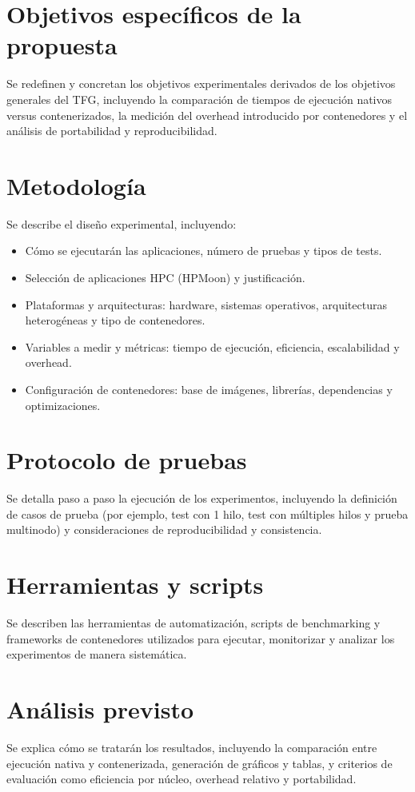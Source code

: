 \section{Objetivos específicos de la propuesta}\label{sec:objetivos_especificos}
Se redefinen y concretan los objetivos experimentales derivados de los objetivos generales del TFG, incluyendo la comparación de tiempos de ejecución nativos versus contenerizados, la medición del overhead introducido por contenedores y el análisis de portabilidad y reproducibilidad.

\section{Metodología}\label{sec:metodologia}
Se describe el diseño experimental, incluyendo:
\begin{itemize}
    \item Cómo se ejecutarán las aplicaciones, número de pruebas y tipos de tests.
    \item Selección de aplicaciones HPC (HPMoon) y justificación.
    \item Plataformas y arquitecturas: hardware, sistemas operativos, arquitecturas heterogéneas y tipo de contenedores.
    \item Variables a medir y métricas: tiempo de ejecución, eficiencia, escalabilidad y overhead.
    \item Configuración de contenedores: base de imágenes, librerías, dependencias y optimizaciones.
\end{itemize}

\section{Protocolo de pruebas}\label{sec:protocolo_pruebas}
Se detalla paso a paso la ejecución de los experimentos, incluyendo la definición de casos de prueba (por ejemplo, test con 1 hilo, test con múltiples hilos y prueba multinodo) y consideraciones de reproducibilidad y consistencia.

\section{Herramientas y scripts}\label{sec:herramientas_scripts}
Se describen las herramientas de automatización, scripts de benchmarking y frameworks de contenedores utilizados para ejecutar, monitorizar y analizar los experimentos de manera sistemática.

\section{Análisis previsto}\label{sec:analisis_previsto}
Se explica cómo se tratarán los resultados, incluyendo la comparación entre ejecución nativa y contenerizada, generación de gráficos y tablas, y criterios de evaluación como eficiencia por núcleo, overhead relativo y portabilidad.

